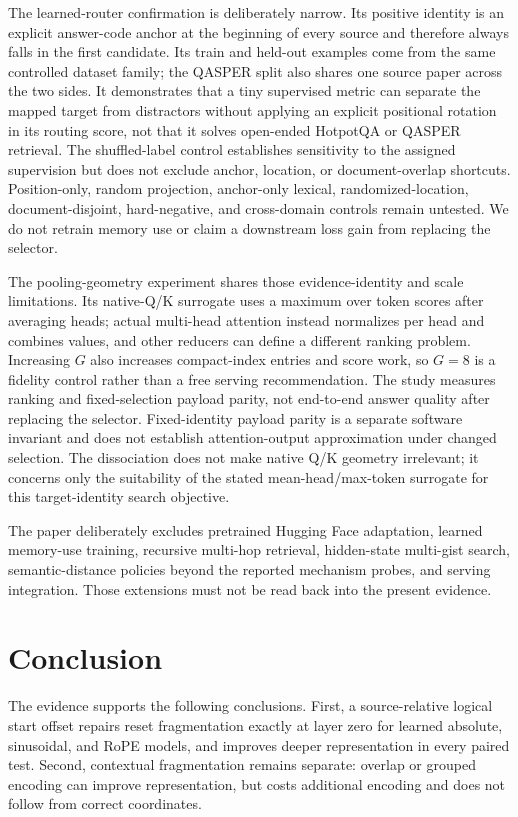 \documentclass[11pt]{article}
\begin{document}
The learned-router confirmation is deliberately narrow. Its positive identity is an explicit
answer-code anchor at the beginning of every source and therefore always falls in the first
candidate. Its train and held-out examples come from the same controlled dataset family; the
QASPER split also shares one source paper across the two sides. It demonstrates that a tiny
supervised metric can separate the mapped target from distractors without applying an explicit
positional rotation in its routing score, not that it solves open-ended HotpotQA or QASPER
retrieval. The shuffled-label control establishes sensitivity to the assigned supervision but
does not exclude anchor, location, or document-overlap shortcuts. Position-only, random
projection, anchor-only lexical, randomized-location, document-disjoint, hard-negative, and
cross-domain controls remain untested. We do not retrain memory use or claim a downstream loss
gain from replacing the selector.

The pooling-geometry experiment shares those evidence-identity and scale limitations. Its
native-Q/K surrogate uses a maximum over token scores after averaging heads; actual multi-head
attention instead normalizes per head and combines values, and other reducers can define a
different ranking problem. Increasing $G$ also increases compact-index entries and
score work, so $G=8$ is a fidelity control rather than a free serving recommendation. The
study measures ranking and fixed-selection payload parity, not end-to-end answer quality after
replacing the selector. Fixed-identity payload parity is a separate software invariant and does
not establish attention-output approximation under changed selection. The dissociation does
not make native Q/K geometry irrelevant; it concerns only the suitability of the stated
mean-head/max-token surrogate for this target-identity search objective.

The paper deliberately excludes pretrained Hugging Face adaptation, learned memory-use
training, recursive multi-hop retrieval, hidden-state multi-gist search, semantic-distance
policies beyond the reported mechanism probes, and serving integration. Those extensions must
not be read back into the present evidence.

\section{Conclusion}

The evidence supports the following conclusions. First, a source-relative logical start offset repairs
reset fragmentation exactly at layer zero for learned absolute, sinusoidal, and RoPE models,
and improves deeper representation in every paired test. Second, contextual fragmentation
remains separate: overlap or grouped encoding can improve representation, but costs additional
encoding and does not follow from correct coordinates.
\end{document}
